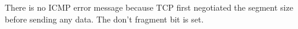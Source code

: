 There is no ICMP error message because TCP first negotiated the segment size before sending any data. The don't fragment bit is set.